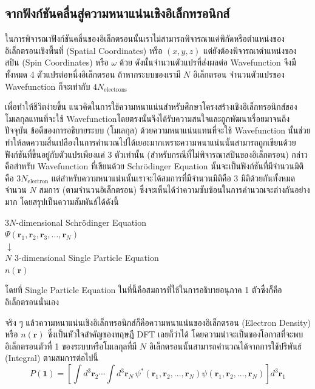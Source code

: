 \subsection{จากฟังก์ชันคลื่นสู่ความหนาแน่นเชิงอิเล็กทรอนิกส์}
\label{ssec:elec_density}

ในการพิจารณาฟังก์ชันคลื่นของอิเล็กตรอนนั้นเราไม่สามารถพิจารณาแค่พิกัดหรือตำแหน่งของอิเล็กตรอนเชิงพื้นที่ (Spatial Coordinates) หรือ $(x, y, z)$ แต่ยังต้องพิจารณาตำแหน่งของสปิน (Spin Coordinates) หรือ $\omega$ ด้วย ดังนั้นจำนวนตัวแปรที่ส่งผลต่อ Wavefunction จึงมีทั้งหมด 4 ตัวแปรต่อหนึ่งอิเล็กตรอน ถ้าหากระบบของเรามี $N$ อิเล็กตรอน จำนวนตัวแปรของ Wavefunction ก็จะเท่ากับ $4 N_{\text{electrons}}$

เพื่อทำให้ชีวิตง่ายขึ้น แนวคิดในการใช้ความหนาแน่นสำหรับศึกษาโครงสร้างเชิงอิเล็กทรอนิกส์ของโมเลกุลแทนที่จะใช้ Wavefunctionโดยตรงนั้นจึงได้รับความสนใจและถูกพัฒนาเรื่อยมาจนถึงปัจจุบัน ข้อดีของการอธิบายระบบ (โมเลกุล) ด้วยความหนาแน่นแทนที่จะใช้ Wavefunction นั้นช่วยทำให้ลดความสิ้นเปลืองในการคำนวณไปได้เยอะมากเพราะความหนาแน่นนั้นสามารถถูกเขียนด้วยฟังก์ชันที่ขึ้นอยู่กับตัวแปรเพียงแค่ 3 ตัวเท่านั้น (สำหรับกรณีที่ไม่พิจารณาสปินของอิเล็กตรอน) กล่าวคือสำหรับ Wavefunction ที่เขียนด้วย Schr\"{o}dinger Equation นั้นจะเป็นฟังก์ชันที่มีจำนวนมิติคือ $3N_{\text{electron}}$ แต่สำหรับความหนาแน่นนั้นเราจะได้สมการที่มีจำนวนมิติคือ 3 มิติด้วยกันทั้งหมดจำนวน $N$ สมการ (ตามจำนวนอิเล็กตรอน) ซึ่งจะเห็นได้ว่าความซับซ้อนในการคำนวณจะต่างกันอย่างมาก โดยสรุปเป็นความสัมพันธ์ได้ดังนี้

\begin{framed}
    \centering
    $3N$-dimensional Schr\"{o}dinger Equation \\
    $\Psi(\bm{r}_{1}, \bm{r}_{2}, \bm{r}_{3}, \dots, \bm{r}_{N})$ \\
    $\downarrow$ \\
    $N$ $3$-dimensional Single Particle Equation \\
    $n({\bm{r}})$
\end{framed}

\noindent โดยที่ Single Particle Equation ในที่นี้คือสมการที่ใช้ในการอธิบายอนุภาค 1 ตัวซึ่งก็คืออิเล็กตรอนนั่นเอง

จริง ๆ แล้วความหนาแน่นเชิงอิเล็กทรอนิกส์ก็คือความหนาแน่นของอิเล็กตรอน (Electron Density) หรือ $n(\bm{r})$ ซึ่งเป็นหัวใจสำคัญของทฤษฎี DFT เลยก็ว่าได้ โดยความน่าจะเป็นของโอกาสที่จะพบอิเล็กตรอนตัวที่ 1 ของระบบหรือโมเลกุลที่มี $N$ อิเล็กตรอนนั้นสามารถคำนวณได้จากการใช้ปริพันธ์ (Integral) ตามสมการต่อไปนี้
%
\begin{equation}\label{eq:elec_prob_density_1e}
    P(\bm{1}) = \left [ \int {d}^{3} \bm{r}_{2} \cdots \int {d}^{3} \bm{r}_{N} \,
        \psi^*(\bm{r}_{1}, \bm{r}_{2}, \dots, \bm{r}_{N}) \psi(\bm{r}_{1}, \bm{r}_2,
        \dots, \bm{r}_N) \right ] {d}^{3} \bm{r}_{1}
\end{equation}

